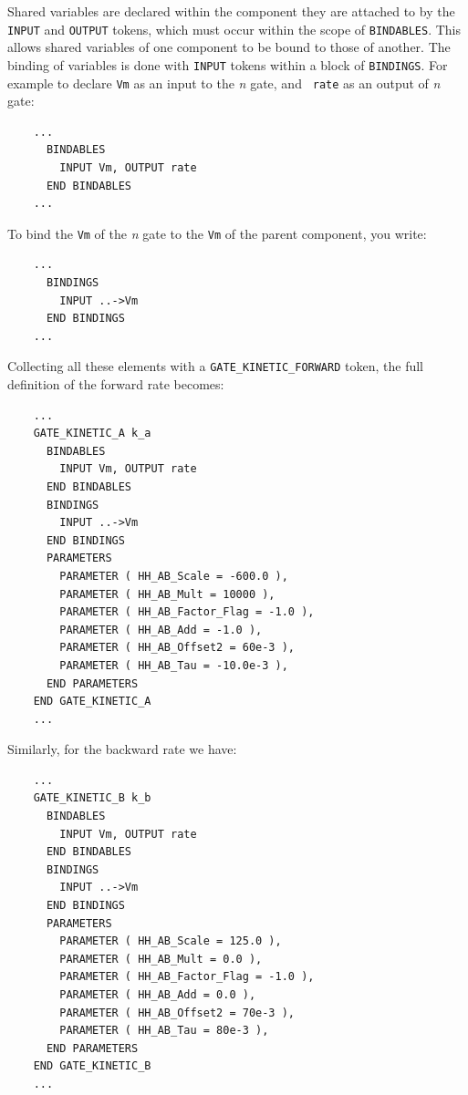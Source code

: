 \documentclass[12pt]{article}
\begin{document}
Shared variables are declared within the component they are attached
to by the {\tt INPUT} and {\tt OUTPUT} tokens, which must occur within
the scope of {\tt BINDABLES}.  This allows shared variables of one
component to be bound to those of another. The binding of variables is
done with {\tt INPUT} tokens within a block of {\tt BINDINGS}.  For
example to declare {\tt Vm} as an input to the {\it n} gate, and {\tt
  rate} as an output of {\it n} gate:

\begin{verbatim}
    ...
      BINDABLES
        INPUT Vm, OUTPUT rate
      END BINDABLES
    ...
\end{verbatim}

To bind the {\tt Vm} of the {\it n} gate to the {\tt Vm} of the parent
component, you write:

\begin{verbatim}
    ...
      BINDINGS
        INPUT ..->Vm
      END BINDINGS
    ...
\end{verbatim}

Collecting all these elements with a {\tt GATE\_KINETIC\_FORWARD}
token, the full definition of the forward rate becomes:

\begin{verbatim}
    ...
    GATE_KINETIC_A k_a
      BINDABLES
        INPUT Vm, OUTPUT rate
      END BINDABLES
      BINDINGS
        INPUT ..->Vm
      END BINDINGS
      PARAMETERS
        PARAMETER ( HH_AB_Scale = -600.0 ),
        PARAMETER ( HH_AB_Mult = 10000 ),
        PARAMETER ( HH_AB_Factor_Flag = -1.0 ),
        PARAMETER ( HH_AB_Add = -1.0 ),
        PARAMETER ( HH_AB_Offset2 = 60e-3 ),
        PARAMETER ( HH_AB_Tau = -10.0e-3 ),
      END PARAMETERS
    END GATE_KINETIC_A
    ...
\end{verbatim}

Similarly, for the backward rate we have:

\begin{verbatim}
    ...
    GATE_KINETIC_B k_b
      BINDABLES
        INPUT Vm, OUTPUT rate
      END BINDABLES
      BINDINGS
        INPUT ..->Vm
      END BINDINGS
      PARAMETERS
        PARAMETER ( HH_AB_Scale = 125.0 ),
        PARAMETER ( HH_AB_Mult = 0.0 ),
        PARAMETER ( HH_AB_Factor_Flag = -1.0 ),
        PARAMETER ( HH_AB_Add = 0.0 ),
        PARAMETER ( HH_AB_Offset2 = 70e-3 ),
        PARAMETER ( HH_AB_Tau = 80e-3 ),
      END PARAMETERS
    END GATE_KINETIC_B
    ...
\end{verbatim}
\end{document}
